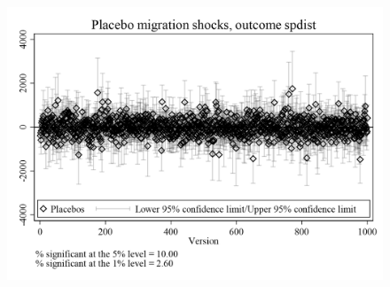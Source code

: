 \documentclass{article}
\begin{document}
\clearpage
\begin{figure}
	\centering
	\includegraphics[width=.8\textwidth]{figures/exogeneity_tests/D17_placebo_spdist_urban.png}
\end{figure}
\clearpage
\end{document}
